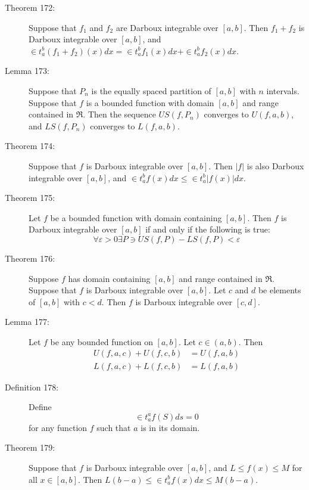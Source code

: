 \documentclass{article}
\begin{document}
\begin{description}
  \item[Theorem 172:] Suppose that $f_{1}$ and $f_{2}$ are Darboux integrable over $[a,b]$. Then $f_{1} + f_{2}$ is Darboux integrable over $[a,b]$, and $\in t_{a}^{b} (f_{1} + f_{2}) (x) dx = \in t_{a}^{b} f_{1}(x) dx + \in t_{a}^{b} f_{2}(x) dx$. 

  \item[Lemma 173:] Suppose that $P_{n}$ is the equally spaced partition of $[a,b]$ with $n$ intervals. Suppose that $f$ is a bounded function with domain $[a,b]$ and range contained in $\Re$. Then the sequence $US (f, P_{n})$ converges to $U (f, a, b)$, and $LS (f, P_{n})$ converges to $L (f, a, b)$. 

  \item[Theorem 174:] Suppose that $f$ is Darboux integrable over $[a,b]$. Then $|f|$ is also Darboux integrable over $[a,b]$, and $\in t_{a}^{b} f(x) dx \leq \in t_{a}^{b} |f(x)| dx$. 

  \item[Theorem 175:] Let $f$ be a bounded function with domain containing $[a,b]$. Then $f$ is Darboux integrable over $[a,b]$ if and only if the following is true:
    \begin{equation*}
    \forall \varepsilon > 0 \exists P \ni US(f,P) -LS(f,P) < \varepsilon
    \end{equation*}

  \item[Theorem 176:] Suppose $f$ has domain containing $[a,b]$ and range contained in $\Re$. Suppose that $f$ is Darboux integrable over $[a,b]$. Let $c$ and $d$ be elements of $[a,b]$ with $c < d$. Then $f$ is Darboux integrable over $[c,d]$. 

  \item[Lemma 177:] Let $f$ be any bounded function on $[a,b]$. Let $c \in (a,b)$. Then
    \begin{align*}
    U(f,a,c) + U(f,c,b) & = U(f,a,b) \\
    L(f,a,c) + L(f,c,b) & = L(f,a,b)
    \end{align*}

  \item[Definition 178:] Define
    \begin{equation*}
    \in t_{a}^{a} f(S) ds = 0
    \end{equation*}
    for any function $f$ such that $a$ is in its domain.

  \item[Theorem 179:] Suppose that $f$ is Darboux integrable over $[a,b]$, and $L \leq f(x) \leq M$ for all $x \in [a,b]$. Then $L(b-a) \leq \in t_{a}^{b} f(x) dx \leq M (b-a)$.


\end{description}
\end{document}
